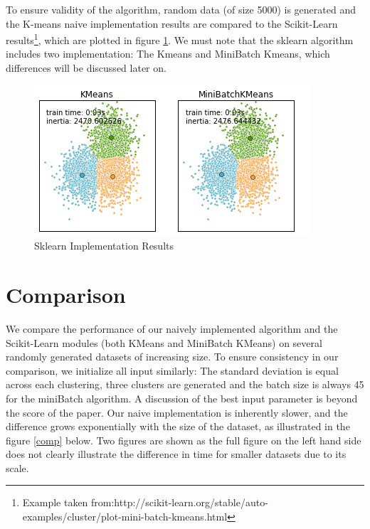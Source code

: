 \documentclass[11pt]{article}
\begin{document}
\noindent To ensure validity of the algorithm, random data (of size 5000) is generated and the K-means naive implementation results are compared to the Scikit-Learn results\footnote{Example taken from:http://scikit-learn.org/stable/auto-examples/cluster/plot-mini-batch-kmeans.html}, which are plotted in figure \ref{results}. We must note that the sklearn algorithm includes two implementation: The Kmeans and MiniBatch Kmeans, which differences will be discussed later on.

	\begin{figure}[ht!] 
		\centering
		\includegraphics[scale=0.8]{Figures/kmeans.png}
		\caption{Sklearn Implementation Results}
		\label{results}
	\end{figure}

\section*{Comparison}

We compare the performance of our naively implemented algorithm and the Scikit-Learn modules (both KMeans and MiniBatch KMeans) on several randomly generated datasets of increasing size. To ensure consistency in our comparison, we initialize all input similarly: The standard deviation is equal across each clustering, three clusters are generated and the batch size is always 45 for the miniBatch algorithm. A discussion of the best input parameter is  beyond the score of the paper.  Our naive implementation is inherently slower, and the difference grows exponentially with the size of the dataset,  as illustrated in the figure \ref{comp} below. Two figures are shown as the full figure on the left hand side does not clearly illustrate the difference in time for smaller datasets due to its scale.
\end{document}
